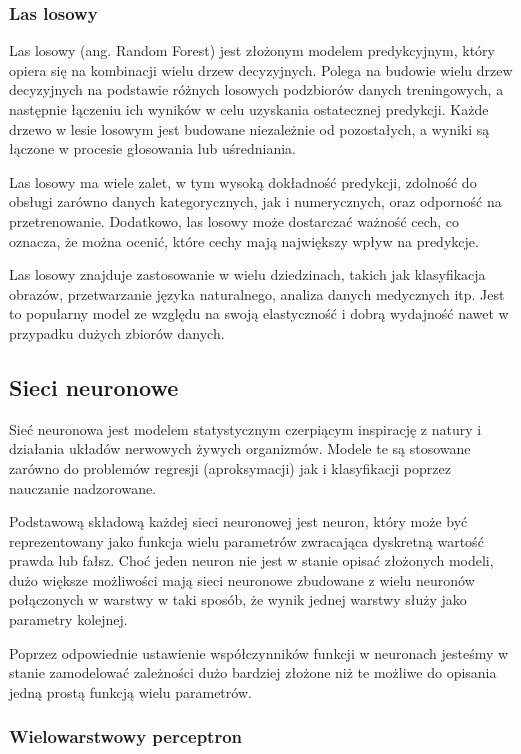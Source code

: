 \documentclass{article}
\begin{document}
\subsubsection{Las losowy}
Las losowy (ang. Random Forest) jest złożonym modelem 
predykcyjnym, który opiera się na kombinacji wielu drzew decyzyjnych. 
Polega na budowie wielu drzew decyzyjnych na podstawie 
różnych losowych podzbiorów danych treningowych, a 
następnie łączeniu ich wyników w celu uzyskania ostatecznej 
predykcji. Każde drzewo w lesie losowym jest budowane 
niezależnie od pozostałych, a wyniki są łączone w procesie 
głosowania lub uśredniania.

Las losowy ma wiele zalet, w tym wysoką dokładność 
predykcji, zdolność do obsługi zarówno danych 
kategorycznych, jak i numerycznych, oraz odporność 
na przetrenowanie. Dodatkowo, las losowy może dostarczać 
ważność cech, co oznacza, że można ocenić, które cechy 
mają największy wpływ na predykcje.

Las losowy znajduje zastosowanie w wielu dziedzinach, 
takich jak klasyfikacja obrazów, przetwarzanie 
języka naturalnego, analiza danych medycznych itp. 
Jest to popularny model ze względu na swoją elastyczność 
i dobrą wydajność nawet w przypadku dużych zbiorów danych.

\subsection{Sieci neuronowe}
Sieć neuronowa jest modelem statystycznym czerpiącym inspirację z natury i 
działania układów nerwowych żywych organizmów.
Modele te są stosowane zarówno do problemów regresji (aproksymacji) jak i klasyfikacji 
poprzez nauczanie nadzorowane.

Podstawową składową każdej sieci neuronowej jest neuron, który może być reprezentowany 
jako funkcja wielu parametrów zwracająca dyskretną wartość
prawda lub fałsz. Choć jeden neuron nie jest w stanie opisać złożonych modeli, 
dużo większe możliwości mają sieci neuronowe zbudowane z wielu neuronów
połączonych w warstwy w taki sposób, że wynik jednej warstwy służy jako parametry kolejnej.


Poprzez odpowiednie ustawienie współczynników funkcji w neuronach jesteśmy w 
stanie zamodelować zależności dużo bardziej złożone niż te możliwe do opisania jedną
prostą funkcją wielu parametrów.

\subsubsection{Wielowarstwowy perceptron}
\end{document}
